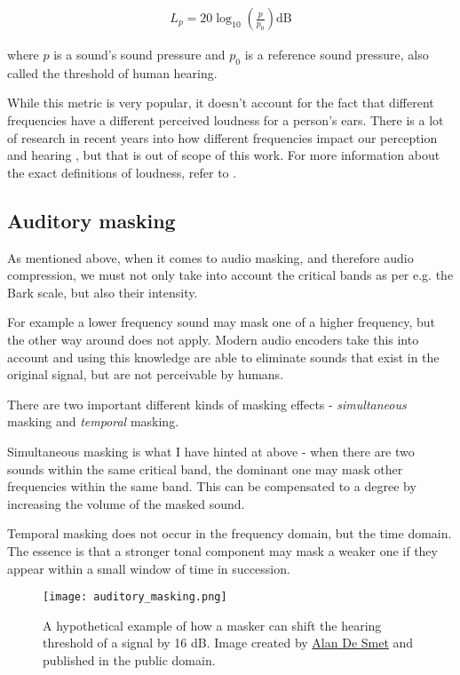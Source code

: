 \begin{align}
L_p = 20 \log_{10} \left( \frac{p}{p_0} \right) \text{dB}
\end{align}

where $p$ is a sound's sound pressure and $p_0$ is a reference sound pressure, also called the threshold of human hearing.

While this metric is very popular, it doesn't account for the fact that different frequencies have a different perceived loudness for a person's ears. \cite{olson1967music} There is a lot of research in recent years into how different frequencies impact our perception and hearing \cite{kuwano_1989}, but that is out of scope of this work. For more information about the exact definitions of loudness, refer to \cite{olson1967music}.

\subsection{Auditory masking}
As mentioned above, when it comes to audio masking, and therefore audio compression, we must not only take into account the critical bands as per e.g. the Bark scale, but also their intensity.

For example a lower frequency sound may mask one of a higher frequency, but the other way around does not apply. \cite{gelfand1990hearing} Modern audio encoders take this into account and using this knowledge are able to eliminate sounds that exist in the original signal, but are not perceivable by humans.

There are two important different kinds of masking effects - \emph{simultaneous} masking and \emph{temporal} masking. \cite{Raissi2002TheTB}

Simultaneous masking is what I have hinted at above - when there are two sounds within the same critical band, the dominant one may mask other frequencies within the same band. This can be compensated to a degree by increasing the volume of the masked sound.

Temporal masking does not occur in the frequency domain, but the time domain. The essence is that a stronger tonal component may mask a weaker one if they appear within a small window of time in succession.

\begin{figure}[ht]
	\caption[Auditory masking]{A hypothetical example of how a masker can shift the hearing threshold of a signal by 16 dB. Image created by \href{http://www.highprogrammer.com/alan/}{Alan De Smet} and published in the public domain.}
	\centering
	\texttt{[image: auditory\_masking.png]}
\end{figure}
